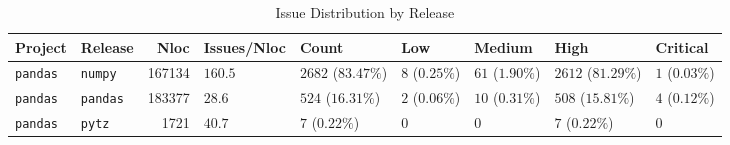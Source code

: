 \begin{table}
\caption{Issue Distribution by Release}
\label{tab:issue-release-distribution}
\begin{tabular}{llrllllll}
\toprule
Project & Release & Nloc & Issues/Nloc & Count & Low & Medium & High & Critical \\
\midrule
\texttt{pandas} & \texttt{numpy} & 167134 & $160.5$ & $2682$ ($83.47\%$) & $8$ ($0.25\%$) & $61$ ($1.90\%$) & $2612$ ($81.29\%$) & $1$ ($0.03\%$) \\
\texttt{pandas} & \texttt{pandas} & 183377 & $28.6$ & $524$ ($16.31\%$) & $2$ ($0.06\%$) & $10$ ($0.31\%$) & $508$ ($15.81\%$) & $4$ ($0.12\%$) \\
\texttt{pandas} & \texttt{pytz} & 1721 & $40.7$ & $7$ ($0.22\%$) & $0$ & $0$ & $7$ ($0.22\%$) & $0$ \\
\bottomrule
\end{tabular}
\end{table}
